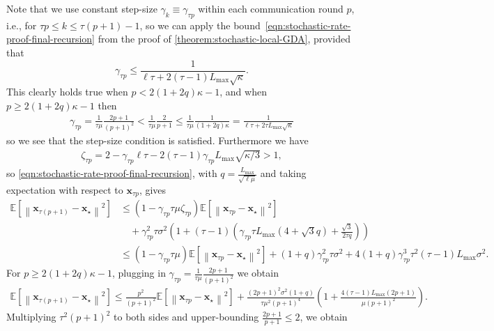 \documentclass{article}
\newcommand{\vx}{{\mathbf{x}}}
\newcommand{\EE}{{\mathbb{E}}}
\newcommand{\sqnorm}[1]{\left\| #1 \right\|^2}
\theoremstyle{plain}
\theoremstyle{remark}
\begin{document}
Note that we use constant step-size $\gamma_k \equiv \gamma_{\tau p}$ within each communication round $p$, i.e., for $\tau p \le k \le \tau(p+1) - 1$, so we can apply the bound~\eqref{eqn:stochastic-rate-proof-final-recursion} from the proof of \cref{theorem:stochastic-local-GDA}, provided that
\[
    \gamma_{\tau p} \le \frac{1}{\ell\tau + 2(\tau-1) L_{\mathrm{max}} \sqrt{\kappa}} .
\]
This clearly holds true when $p < 2(1+2q)\kappa-1$, and when $p \ge 2(1+2q)\kappa-1$ then
\begin{align*}
    \gamma_{\tau p} = \frac{1}{\tau\mu} \frac{2p+1}{(p+1)^2} < \frac{1}{\tau\mu} \frac{2}{p+1} \le \frac{1}{\tau\mu} \frac{1}{(1+2q)\kappa} = \frac{1}{\ell\tau + 2\tau L_{\mathrm{max}} \sqrt{\kappa}}
\end{align*}
so we see that the step-size condition is satisfied.
Furthermore we have
\begin{align*}
    \zeta_{\tau p} = 2 - \gamma_{\tau p} \ell\tau - 2(\tau - 1)\gamma_{\tau p} L_{\mathrm{max}} \sqrt{\kappa/3} > 1 ,
\end{align*}
so \eqref{eqn:stochastic-rate-proof-final-recursion}, with $q=\frac{L_{\mathrm{max}}}{\sqrt{\ell\mu}}$ and taking expectation with respect to $\vx_{\tau p}$, gives
\begin{align}
    \EE \left[ \sqnorm{\vx_{\tau(p+1)} - \vx_\star} \right] & \le (1 - \gamma_{\tau p} \tau \mu \zeta_{\tau p}) \EE \left[ \sqnorm{\vx_{\tau p} - \vx_\star} \right] \nonumber \\
    & \quad + \gamma_{\tau p}^2 \tau \sigma^2 \left( 1+ (\tau - 1) \left( \gamma_{\tau p} \tau L_{\mathrm{max}} (4 + \sqrt{3} q) + \frac{\sqrt{3}}{2\tau q}  \right) \right) \nonumber \\
    & \le (1 - \gamma_{\tau p} \tau \mu) \EE \left[ \sqnorm{\vx_{\tau p} - \vx_\star} \right] + (1+q) \gamma_{\tau p}^2 \tau \sigma^2 + 4(1+q) \gamma_{\tau p}^3 \tau^2 (\tau-1) L_{\mathrm{max}} \sigma^2 . \label{eqn:stochastic-bound-recursion-with-q}
\end{align}
For $p \ge 2(1+2q)\kappa - 1$, plugging in $\gamma_{\tau p} = \frac{1}{\tau\mu} \frac{2p+1}{(p+1)^2}$ we obtain
\begin{align*}
    \mathbb{E} \left[\sqnorm{\vx_{\tau (p+1)} - \vx_\star}\right] \le \frac{p^2}{(p+1)^2} \EE \left[ \sqnorm{\vx_{\tau p} - \vx_\star} \right] + \frac{(2p+1)^2 \sigma^2 (1+q)}{\tau \mu^2 (p+1)^4} \left( 1 + \frac{4(\tau-1) L_{\mathrm{max}} (2p+1)}{\mu (p+1)^2} \right) .
\end{align*}
Multiplying $\tau^2 (p+1)^2$ to both sides and upper-bounding $\frac{2p+1}{p+1} \le 2$, we obtain
\end{document}
